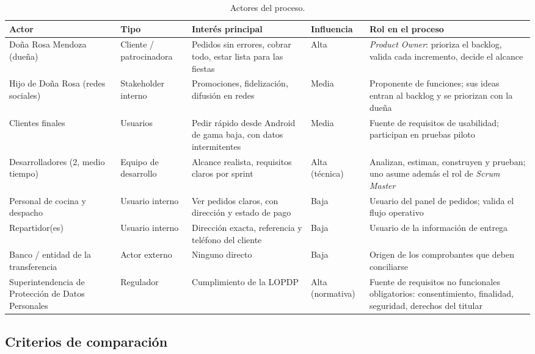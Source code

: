 \documentclass[11pt,a4paper]{article}
\begin{document}
\begin{table}[htbp]
\centering
\caption{Actores del proceso.}
\label{tab:actores}
\footnotesize
\begin{tabularx}{\textwidth}{@{}P{3.1cm}P{2.0cm}LP{1.5cm}L@{}}
\toprule
\textbf{Actor} & \textbf{Tipo} & \textbf{Interés principal} & \textbf{Influencia} & \textbf{Rol en el proceso} \\
\midrule
Doña Rosa Mendoza (dueña) & Cliente / patrocinadora & Pedidos sin errores, cobrar todo, estar lista para las fiestas & Alta & \emph{Product Owner}: prioriza el backlog, valida cada incremento, decide el alcance \\
Hijo de Doña Rosa (redes sociales) & Stakeholder interno & Promociones, fidelización, difusión en redes & Media & Proponente de funciones; sus ideas entran al backlog y se priorizan con la dueña \\
Clientes finales & Usuarios & Pedir rápido desde Android de gama baja, con datos intermitentes & Media & Fuente de requisitos de usabilidad; participan en pruebas piloto \\
Desarrolladores (2, medio tiempo) & Equipo de desarrollo & Alcance realista, requisitos claros por sprint & Alta (técnica) & Analizan, estiman, construyen y prueban; uno asume además el rol de \emph{Scrum Master} \\
Personal de cocina y despacho & Usuario interno & Ver pedidos claros, con dirección y estado de pago & Baja & Usuario del panel de pedidos; valida el flujo operativo \\
Repartidor(es) & Usuario interno & Dirección exacta, referencia y teléfono del cliente & Baja & Usuario de la información de entrega \\
Banco / entidad de la transferencia & Actor externo & Ninguno directo & Baja & Origen de los comprobantes que deben conciliarse \\
Superintendencia de Protección de Datos Personales & Regulador & Cumplimiento de la LOPDP & Alta (normativa) & Fuente de requisitos no funcionales obligatorios: consentimiento, finalidad, seguridad, derechos del titular \cite{lopdp2021,reglamento2023} \\
\bottomrule
\end{tabularx}
\end{table}

\subsection{Criterios de comparación}
\end{document}
